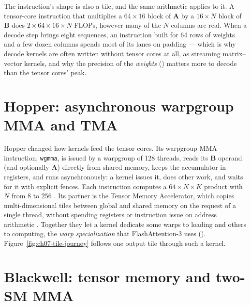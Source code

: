 The instruction's shape is also a tile, and the same arithmetic applies to it.
A tensor-core instruction that multiplies a $64 \times 16$ block of $\mathbf{A}$ by
a $16 \times N$ block of $\mathbf{B}$ does $2 \times 64 \times 16 \times N$ FLOPs,
however many of the $N$ columns are real. When a decode step brings eight
sequences, an instruction built for 64 rows of weights and a few dozen columns
spends most of its lanes on padding --- which is why decode kernels are often
written without tensor cores at all, as streaming matrix--vector kernels, and
why the precision of the \emph{weights} () matters more
to decode than the tensor cores' peak.

\section{Hopper: asynchronous warpgroup MMA and TMA}

Hopper changed how kernels feed the tensor cores. Its warpgroup MMA
instruction, \texttt{wgmma}, is issued by a warpgroup of 128 threads, reads its
$\mathbf{B}$ operand (and optionally $\mathbf{A}$) directly from shared memory,
keeps the accumulator in registers, and runs asynchronously: a kernel issues
it, does other work, and waits for it with explicit fences. Each instruction
computes a $64\times N\times K$ product with $N$ from 8 to 256
\cite{nvidia2026cutlasswgmma}. Its partner is the Tensor Memory Accelerator,
which copies multi-dimensional tiles between global and shared memory on the
request of a single thread, without spending registers or instruction issue on
address arithmetic \cite{nvidia2026hoppertuning}. Together they let a kernel
dedicate some warps to loading and others to computing, the
\emph{warp specialization} that FlashAttention-3 uses ().
Figure~\ref{fig:ch07-tile-journey} follows one output tile through such a
kernel.


\section{Blackwell: tensor memory and two-SM MMA}

